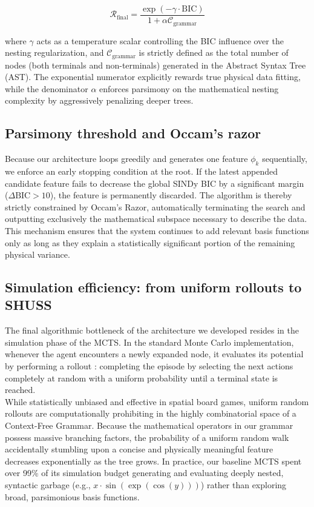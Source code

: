 \documentclass[11pt, a4paper]{article}
\begin{document}
\begin{equation}
    \boxed{
        \mathcal{R}_{\text{final}} = \frac{\exp(-\gamma \cdot \text{BIC})}{1 + \alpha \mathcal{C}_{\text{grammar}}}
    }
\end{equation}

where $\gamma$ acts as a temperature scalar controlling the BIC influence over the nesting regularization, and $\mathcal{C}_{\text{grammar}}$ is strictly defined as the total number of nodes (both terminals and non-terminals) generated in the Abstract Syntax Tree (AST). The exponential numerator explicitly rewards true physical data fitting, while the denominator $\alpha$ enforces parsimony on the mathematical nesting complexity by aggressively penalizing deeper trees.


\vspace{0.3cm}
\subsection{Parsimony threshold and Occam's razor}
\label{subsec:parsimony}
Because our architecture loops greedily and generates one feature $\phi_k$ sequentially, we enforce an early stopping condition at the root. If the latest appended candidate feature fails to decrease the global SINDy BIC by a significant margin ($\Delta \text{BIC} > 10$), the feature is permanently discarded. The algorithm is thereby strictly constrained by Occam's Razor, automatically terminating the search and outputting exclusively the mathematical subspace necessary to describe the data. This mechanism ensures that the system continues to add relevant basis functions only as long as they explain a statistically significant portion of the remaining physical variance.

\subsection{Simulation efficiency: from uniform rollouts to SHUSS}

The final algorithmic bottleneck of the architecture we developed resides in the simulation phase of the MCTS. In the standard Monte Carlo implementation, whenever the agent encounters a newly expanded node, it evaluates its potential by performing a rollout : completing the episode by selecting the next actions completely at random with a uniform probability until a terminal state is reached.\\

While statistically unbiased and effective in spatial board games, uniform random rollouts are computationally prohibiting in the highly combinatorial space of a Context-Free Grammar. Because the mathematical operators in our grammar possess massive branching factors, the probability of a uniform random walk accidentally stumbling upon a concise and physically meaningful feature decreases exponentially as the tree grows. In practice, our baseline MCTS spent over 99\% of its simulation budget generating and evaluating deeply nested, syntactic garbage (e.g., $x \cdot \sin(\exp(\cos(y)))$) rather than exploring broad, parsimonious basis functions.\\
\end{document}
